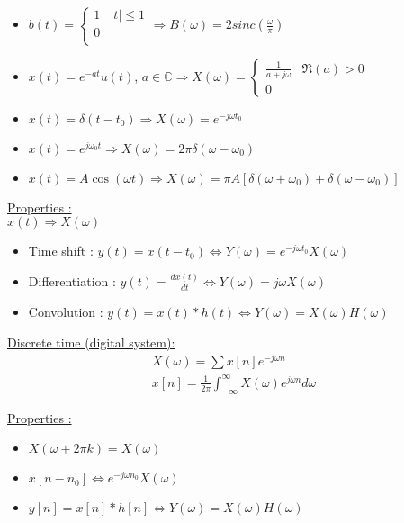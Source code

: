 \documentclass[../main.tex]{subfiles}
\begin{document}
\begin{itemize}
    \item $b(t) = \begin{cases}
        1 & \lvert t \rvert \leq 1\\
        0 & \\
    \end{cases} \Rightarrow B(\omega) = 2 sinc(\frac{\omega}{\pi})$
    \item $x(t) = e^{-at} u(t)$, $a\in \mathbb{C} \Rightarrow X(\omega) = \begin{cases}\frac{1}{a+j\omega} & \Re(a)>0\\
    0
    \end{cases}$
    \item $x(t) = \delta(t-t_0) \Rightarrow X(\omega) = e^{-j\omega t_0}$
    \item $x(t) = e^{j\omega_0 t} \Rightarrow X(\omega) = 2\pi \delta(\omega- \omega_0)$
    \item $x(t) = A\cos(\omega t) \Rightarrow X(\omega) = \pi A [\delta(\omega + \omega_0) + \delta(\omega - \omega_0)]$
\end{itemize}

 \quad \underline{Properties :}\\
 $x(t) \Rightarrow X(\omega)$
 \begin{itemize}
     \item Time shift : $y(t) = x(t-t_0) \Leftrightarrow Y(\omega) =  e^{-j\omega t_0}X(\omega)$
     \item Differentiation : $y(t) = \frac{d x(t)}{dt} \Leftrightarrow Y(\omega) = j\omega X(\omega)$
     \item Convolution : $y(t) = x(t) * h(t) \Leftrightarrow Y(\omega) = X(\omega) H(\omega)$
 \end{itemize}

 \quad \underline{Discrete time (digital system):}\\
 \begin{equation}
 \begin{gathered}
     X(\omega) = \sum x[n] e^{-j\omega n}\\
     x[n] = \frac{1}{2\pi} \int_{-\infty}^\infty X(\omega) e^{j \omega n} d\omega
     \end{gathered}
 \end{equation}

 \quad \underline{Properties :}\\
\begin{itemize}
    \item $X(\omega + 2\pi k) = X(\omega)$
    \item $x[n-n_0] \Leftrightarrow e^{-j \omega n_0} X(\omega)$
    \item $y[n] = x[n] * h[n] \Leftrightarrow Y(\omega) = X(\omega) H(\omega)$
    \end{itemize}
\end{document}
